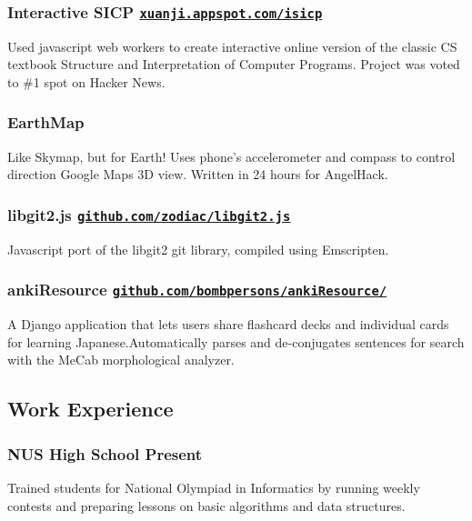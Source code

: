 \documentclass[letterpaper]{article}
\begin{document}
\subsubsection*{Interactive SICP \hfill \href{http://xuanji.appspot.com/isicp}{\tt xuanji.appspot.com/isicp}}
Used javascript web workers to create interactive online version of the classic CS textbook Structure and Interpretation of Computer Programs. Project was voted to \#1 spot on Hacker News.

\subsubsection*{EarthMap}
Like Skymap, but for Earth! Uses phone's accelerometer and compass to control direction Google Maps 3D view. Written in 24 hours for AngelHack.

\subsubsection*{libgit2.js \hfill \href{https://github.com/zodiac/libgit2.js}{\tt github.com/zodiac/libgit2.js}}
Javascript port of the libgit2 git library, compiled using Emscripten.

\subsubsection*{ankiResource \hfill \href{https://github.com/bombpersons/ankiResource}{\tt github.com/bombpersons/ankiResource/}}
A Django application that lets users share flashcard decks and individual cards for learning Japanese.Automatically parses and de-conjugates sentences for search with the MeCab morphological analyzer.

\vspace{1em}

\begin{center}
\section*{Work Experience}
\end{center}

\subsubsection*{NUS High School \hfill Present}
Trained students for National Olympiad in Informatics by running weekly contests and preparing lessons on basic algorithms and data structures.
\end{document}
